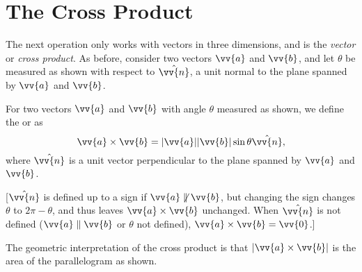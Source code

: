 \section{The Cross Product}

The next operation only works with vectors in three dimensions, and is the \emph{vector} or \emph{cross product}. As before, consider two vectors $\vv{a}$ and $\vv{b}$, and let $\theta$ be measured as shown with respect to $\hat{\vv{n}}$, a unit normal to the plane spanned by $\vv{a}$ and $\vv{b}$.

\begin{center}
  \end{center}

  \begin{definition}
For two vectors $\vv{a}$ and $\vv{b}$ with angle  $\theta$ measured as shown, we define the  or  as
$$
\vv{a} \times \vv{b} = | \vv{a}| |\vv{b}| \sin \theta \hat{\vv{n}},
$$
where $\hat{\vv{n}}$ is a unit vector perpendicular to the plane spanned by $\vv{a}$ and $\vv{b}$.

[$\hat{\vv{n}}$ is defined up to a sign if $\vv{a} \not \parallel \vv{b}$, but changing the sign changes $\theta$ to $2\pi - \theta$, and thus leaves $\vv{a} \times \vv{b}$ unchanged. When $\hat{\vv{n}}$ is not defined ($\vv{a} \parallel \vv{b}$ or $\theta$ not defined), $\vv{a} \times \vv{b} = \vv{0}$.] 
  \end{definition}

  The geometric interpretation of the cross product is that $|\vv{a} \times \vv{b}|$ is the area of the parallelogram as shown.


